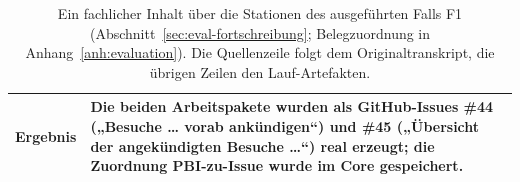 \begin{table}[htbp]
\begin{tabular}{>{\raggedright\arraybackslash}p{}>{\raggedright\arraybackslash}p{}}
    Ergebnis & Die beiden Arbeitspakete wurden als GitHub-Issues \#44 („Besuche \ldots{} vorab ankündigen``) und \#45 („Übersicht der angekündigten Besuche \ldots``) real erzeugt; die Zuordnung PBI-zu-Issue wurde im Core gespeichert. \\
    \hline
  \end{tabular}
  \caption[Besuchsankündigung: von der Quelle zum Issue]{Ein
    fachlicher Inhalt über die Stationen des ausgeführten Falls F1
    (Abschnitt~\ref{sec:eval-fortschreibung}; Belegzuordnung in
    Anhang~\ref{anh:evaluation}). Die Quellenzeile folgt dem
    Originaltranskript, die übrigen Zeilen den Lauf-Artefakten.}
  \label{t:beispiel-besuchsplanung}
\end{table}
